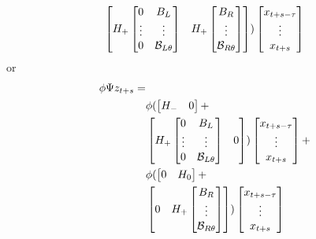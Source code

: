 \documentclass{elsart}
\begin{document}
\begin{prf}
\begin{gather}
\begin{split}
\begin{bmatrix}
    H_+ \begin{bmatrix}
    0&B_L\\\vdots&\vdots\\0&\mathcal{B}_{L\theta}
  \end{bmatrix}& H_+\begin{bmatrix}
    B_R\\\vdots\\\mathcal{B}_{R\theta}
  \end{bmatrix}
  \end{bmatrix})  \begin{bmatrix}
    x_{t+s-\tau}\\\vdots\\x_{t+s}
  \end{bmatrix}
  \end{split}
  \end{gather}
or
\begin{gather}
  \begin{split}
\phi\Psi z_{t+s}=&\\
&\phi   (\begin{bmatrix}
H_-&0
  \end{bmatrix} + \\
&  \begin{bmatrix}
    H_+ \begin{bmatrix}
    0&B_L\\\vdots&\vdots\\0&\ugBL{\theta}
  \end{bmatrix}& 0 
  \end{bmatrix})  \begin{bmatrix}
    x_{t+s-\tau}\\\vdots\\x_{t+s}
  \end{bmatrix}+\\
&\phi   (  \begin{bmatrix}
    0&H_0
  \end{bmatrix} + \\
&  \begin{bmatrix}
0& H_+\begin{bmatrix}
    B_R\\\vdots\\\ugBR{\theta}
  \end{bmatrix}
  \end{bmatrix})  \begin{bmatrix}
    x_{t+s-\tau}\\\vdots\\x_{t+s}
  \end{bmatrix}
  \end{split}

\end{gather}
\end{prf}
\end{document}
